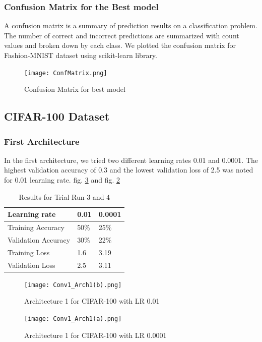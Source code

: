 \documentclass{article}
\begin{document}
\subsubsection{Confusion Matrix for the Best model}
A confusion matrix is a summary of prediction results on a classification problem. The number of correct and incorrect predictions are summarized with count values and broken down by each class. We plotted the confusion matrix for Fashion-MNIST dataset using scikit-learn library.

\begin{figure}[H]
    \centering
    \texttt{[image: ConfMatrix.png]}
    \caption{Confusion Matrix for best model}
    \label{fig:ConfMatrix}
\end{figure}

\subsection{CIFAR-100 Dataset}
\subsubsection{First Architecture}
In the first architecture, we tried two different learning rates 0.01 and 0.0001. The highest validation accuracy of 0.3 and the lowest validation loss of 2.5 was noted for 0.01 learning rate. fig. \ref{fig:Arch1_CNN(a)} and fig. \ref{fig:Arch1_CNN(b)}

\begin{table}[h]
\centering
\caption{Results for Trial Run 3 and 4}
\begin{tabular}{|l|l|l|}
\hline
Learning rate & 0.01 & 0.0001 \\ \hline
Training Accuracy   & 50\% & 25\% \\ \hline
Validation Accuracy & 30\% & 22\%\\ \hline
Training Loss        & 1.6 & 3.19 \\ \hline
Validation Loss     & 2.5 & 3.11 \\ \hline
\end{tabular}
\end{table}

\begin{figure}[H]
    \centering
    \texttt{[image: Conv1\_Arch1(b).png]}
    \caption{Architecture 1 for CIFAR-100 with LR 0.01}
    \label{fig:Arch1_CNN(b)}
\end{figure}

\begin{figure}[H]
    \centering
    \texttt{[image: Conv1\_Arch1(a).png]}
    \caption{Architecture 1 for CIFAR-100 with LR 0.0001}
    \label{fig:Arch1_CNN(a)}
\end{figure}
\end{document}
